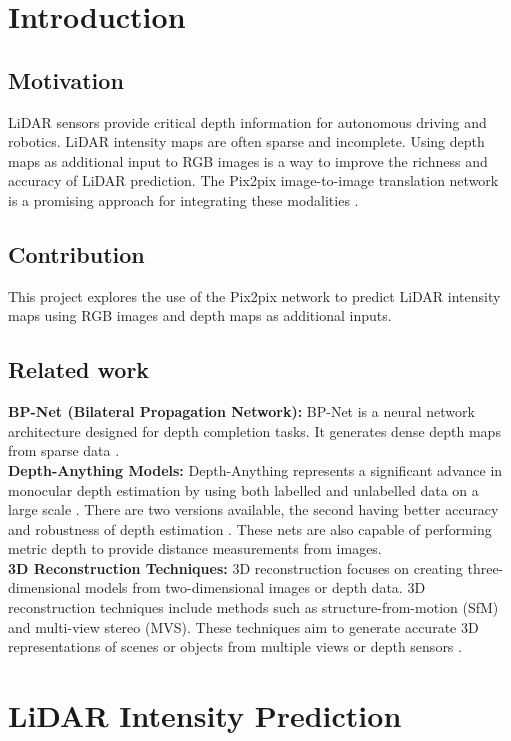 \chapter{Introduction}
\label{chap:intro}

\section{Motivation}
\label{sect:motivation}
LiDAR sensors provide critical depth information for autonomous driving and robotics. LiDAR intensity maps are often sparse and incomplete. Using depth maps as additional input to RGB images is a way to improve the richness and accuracy of LiDAR prediction. The Pix2pix image-to-image translation network is a promising approach for integrating these modalities \cite{CycleGAN2017} \cite{isola2017image}.
\section{Contribution}
This project explores the use of the Pix2pix network to predict LiDAR intensity maps using RGB images and depth maps as additional inputs.
\section{Related work}
\textbf{BP-Net (Bilateral Propagation Network):} BP-Net is a neural network architecture designed for depth completion tasks. It generates dense depth maps from sparse data \cite{BP-Net}. \\
\newline \textbf{Depth-Anything Models:}  Depth-Anything represents a significant advance in monocular depth estimation by using both labelled and unlabelled data on a large scale \cite{depthanything}. There are two versions available, the second having better accuracy and robustness of depth estimation \cite{depth_anything_v2}. These nets are also capable of performing metric depth to provide distance measurements from images.
\\ \textbf{3D Reconstruction Techniques:} 3D reconstruction focuses on creating three-dimensional models from two-dimensional images or depth data. 3D reconstruction techniques include methods such as structure-from-motion (SfM) and multi-view stereo (MVS). These techniques aim to generate accurate 3D representations of scenes or objects from multiple views or depth sensors \cite{saxena2008depth}.


\chapter{LiDAR Intensity Prediction} %
